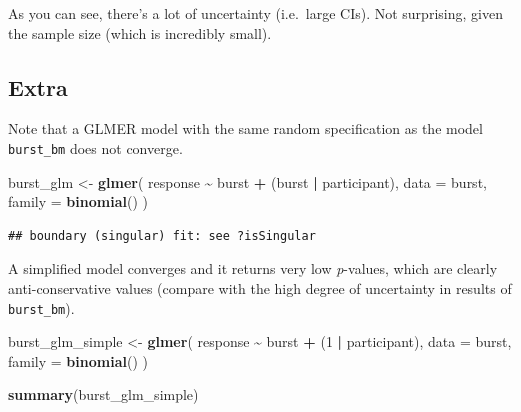\documentclass[
]{article}
\newenvironment{Shaded}{\begin{snugshade}}{\end{snugshade}}
\newcommand{\DataTypeTok}[1]{\textcolor[rgb]{0.13,0.29,0.53}{#1}}
\newcommand{\DecValTok}[1]{\textcolor[rgb]{0.00,0.00,0.81}{#1}}
\newcommand{\KeywordTok}[1]{\textcolor[rgb]{0.13,0.29,0.53}{\textbf{#1}}}
\newcommand{\NormalTok}[1]{#1}
\newcommand{\OperatorTok}[1]{\textcolor[rgb]{0.81,0.36,0.00}{\textbf{#1}}}
\newcommand{\StringTok}[1]{\textcolor[rgb]{0.31,0.60,0.02}{#1}}
\begin{document}
As you can see, there's a lot of uncertainty (i.e.~large CIs). Not
surprising, given the sample size (which is incredibly small).

\hypertarget{extra}{%
\subsection{Extra}\label{extra}}

Note that a GLMER model with the same random specification as the model
\texttt{burst\_bm} does not converge.

\begin{Shaded}
\begin{Highlighting}[]
\NormalTok{burst\_glm \textless{}{-}}\StringTok{ }\KeywordTok{glmer}\NormalTok{(}
\NormalTok{  response }\OperatorTok{\textasciitilde{}}
\StringTok{    }\NormalTok{burst }\OperatorTok{+}
\StringTok{    }\NormalTok{(burst }\OperatorTok{|}\StringTok{ }\NormalTok{participant),}
  \DataTypeTok{data =}\NormalTok{ burst,}
  \DataTypeTok{family =} \KeywordTok{binomial}\NormalTok{()}
\NormalTok{)}
\end{Highlighting}
\end{Shaded}

\begin{verbatim}
## boundary (singular) fit: see ?isSingular
\end{verbatim}

A simplified model converges and it returns very low \emph{p}-values,
which are clearly anti-conservative values (compare with the high degree
of uncertainty in results of \texttt{burst\_bm}).

\begin{Shaded}
\begin{Highlighting}[]
\NormalTok{burst\_glm\_simple \textless{}{-}}\StringTok{ }\KeywordTok{glmer}\NormalTok{(}
\NormalTok{  response }\OperatorTok{\textasciitilde{}}
\StringTok{    }\NormalTok{burst }\OperatorTok{+}
\StringTok{    }\NormalTok{(}\DecValTok{1} \OperatorTok{|}\StringTok{ }\NormalTok{participant),}
  \DataTypeTok{data =}\NormalTok{ burst,}
  \DataTypeTok{family =} \KeywordTok{binomial}\NormalTok{()}
\NormalTok{)}

\KeywordTok{summary}\NormalTok{(burst\_glm\_simple)}
\end{Highlighting}
\end{Shaded}
\end{document}
